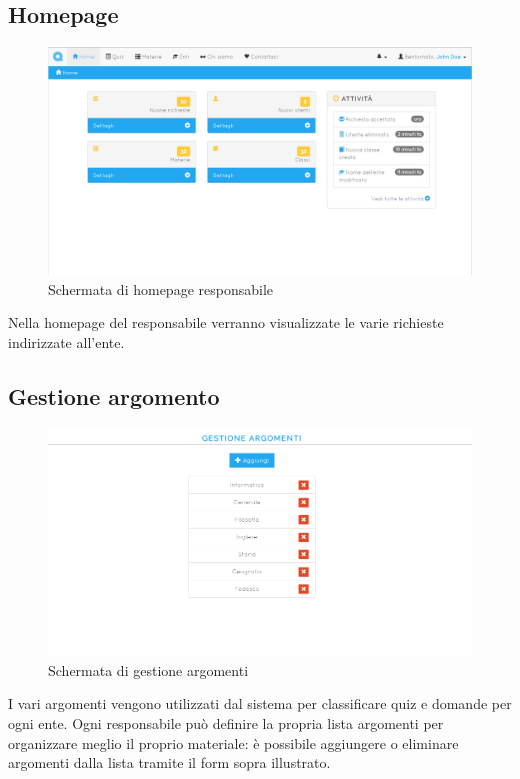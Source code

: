 \documentclass[a4paper, titlepage]{article}
\begin{document}
	 \subsection{Homepage}
	 \begin{figure}[!h]
	 	\centering
	 	\includegraphics[scale=0.33]{Img/screen_HomepageResponsabile.png}
	 	\caption{Schermata di homepage responsabile}
	 \end{figure}
	 Nella homepage del responsabile verranno visualizzate le varie richieste indirizzate all'ente.
	 
	 \subsection{Gestione argomento}
	 \begin{figure}[!h]
	 	\centering
	 	\includegraphics[scale=0.33]{Img/screen_GestioneArgomenti.png}
	 	\caption{Schermata di gestione argomenti}
	 \end{figure}
	 I vari argomenti vengono utilizzati dal sistema per classificare quiz e domande per ogni ente. Ogni responsabile può definire la propria lista argomenti per organizzare meglio il proprio materiale: è possibile aggiungere o eliminare argomenti dalla lista tramite il form sopra illustrato.
	 
\end{document}
